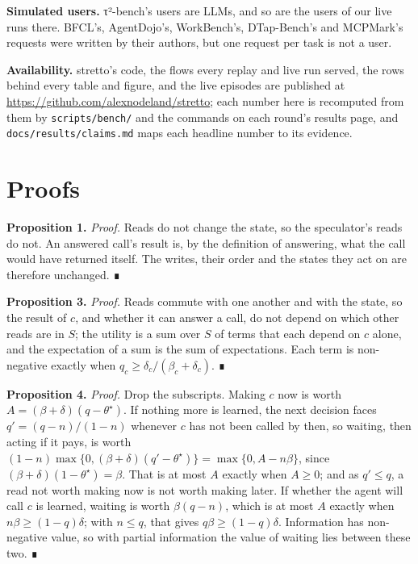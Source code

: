 \documentclass[10pt,twocolumn,letterpaper]{article}
\newcommand{\runin}[1]{{\sffamily\bfseries\color{accent}#1}}
\begin{document}
\runin{Simulated users.} τ²-bench's users are LLMs, and so are the users of our live runs there. BFCL's, AgentDojo's, WorkBench's, DTap-Bench's and MCPMark's requests were written by their authors, but one request per task is not a user.

\runin{Availability.} stretto's code, the flows every replay and live run served, the rows behind every table and figure, and the live episodes are published at \url{https://github.com/alexnodeland/stretto}; each number here is recomputed from them by \texttt{scripts/bench/} and the commands on each round's results page, and \texttt{docs/results/claims.md} maps each headline number to its evidence.





\appendix

\hypertarget{proofs}{%
\section{Proofs}\label{proofs}}

\runin{Proposition 1.} \emph{Proof.} Reads do not change the state, so the speculator's reads do not. An answered call's result is, by the definition of answering, what the call would have returned itself. The writes, their order and the states they act on are therefore unchanged. ∎

\runin{Proposition 3.} \emph{Proof.} Reads commute with one another and with the state, so the result of \(c\), and whether it can answer a call, do not depend on which other reads are in \(S\); the utility is a sum over \(S\) of terms that each depend on \(c\) alone, and the expectation of a sum is the sum of expectations. Each term is non-negative exactly when \(q_c \ge \delta_c/(\beta_c+\delta_c)\). ∎

\runin{Proposition 4.} \emph{Proof.} Drop the subscripts. Making \(c\) now is worth \(A = (\beta+\delta)(q-\theta^\star)\). If nothing more is learned, the next decision faces \(q' = (q-n)/(1-n)\) whenever \(c\) has not been called by then, so waiting, then acting if it pays, is worth \((1-n)\max\{0,(\beta+\delta)(q'-\theta^\star)\} = \max\{0, A-n\beta\}\), since \((\beta+\delta)(1-\theta^\star) = \beta\). That is at most \(A\) exactly when \(A \ge 0\); and as \(q' \le q\), a read not worth making now is not worth making later. If whether the agent will call \(c\) is learned, waiting is worth \(\beta(q-n)\), which is at most \(A\) exactly when \(n\beta \ge (1-q)\delta\); with \(n \le q\), that gives \(q\beta \ge (1-q)\delta\). Information has non-negative value, so with partial information the value of waiting lies between these two. ∎
\end{document}
